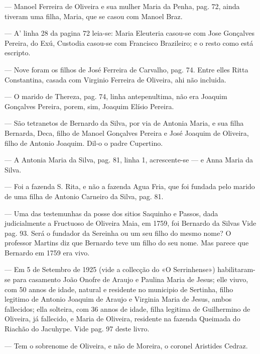 — Manoel Ferreira de Oliveira e sua mulher Maria da Penha, pag. 72, ainda tiveram uma filha, Maria, que se casou com Manoel Braz.

— A' linha 28 da pagina 72 leia-se: Maria Eleuteria casou-se com Jose Gonçalves Pereira, do Exú, Custodia casou-se com Francisco Brazileiro; e o resto como está escripto.

— Nove foram os filhos de José Ferreira de Carvalho, pag. 74. Entre elles Ritta Constantina, casada com Virginio Ferreira de Oliveira, ahi não incluida.

— O marido de Thereza, pag. 74, linha antepenultima, não era Joaquim Gonçalves Pereira, porem, sim, Joaquim Elísio Pereira.

— São tetranetos de Bernardo da Silva, por via de Antonia Maria, e sua filha Bernarda, Deca, filho de Manoel Gonçalves Pereira e José Joaquim de Oliveira, filho de Antonio Joaquim. Dil-o o padre Cupertino.


— A Antonia Maria da Silva, pag. 81, linha 1, acrescente-se — e Anna Maria da Silva.

— Foi a fazenda S. Rita, e não a fazenda Agua Fria, que foi fundada pelo marido de uma filha de Antonio Carneiro da Silva, pag. 81.

— Uma das testemunhas da posse dos sitios Saquinho e Passos, dada judicialmente a Fructuoso de Oliveira Maia, em 1759, foi Bernardo da Silvas Vide pag. 93. Será o fundador da Sereinha ou um seu filho do mesmo nome? O professor Martins diz que Bernardo teve um filho do seu nome. Mas parece que Bernardo em 1759 era vivo.

— Em 5 de Setembro de 1925 (vide a collecção do «O Serrinhense») habilitaram-se para casamento João Onofre de Araujo e Paulina Maria de Jesus; elle viuvo, com 50 annos de idade, natural e residente no municipio de Sertinha, filho legitimo de Antonio Joaquim de Araujo e Virginia Maria de Jesus, ambos fallecidos; ella solteira, com 36 annos de idade, filha legitima de Guilhermino de Oliveira, já fallecido, e
Maria de Oliveira, residente na fazenda Queimada do Riachão do Jacuhype. Vide pag. 97 deste livro.

— Tem o sobrenome de Oliveira, e não de Moreira, o coronel Aristides Cedraz.

